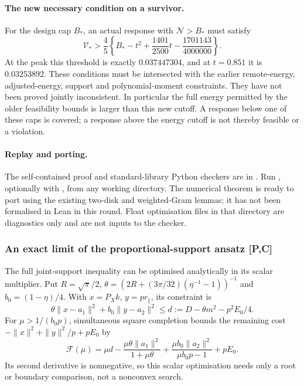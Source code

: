 \paragraph{The new necessary condition on a survivor.}
For the design cap $B_*$, an actual response with $\mathcal N>B_*$ must
satisfy
\begin{equation}\label{eq:weighted-full-energy-survivor}
 \boxed{\quad
 \mathcal V_*>\frac45\left\{B_*-t^2+\frac{1401}{2500}t
                          -\frac{1701143}{4000000}\right\}.
 \quad}
\end{equation}
At the peak this threshold is exactly $0.037447304$, and at $t=0.851$
it is $0.03253892$. These conditions must be intersected with the earlier
remote-energy, adjusted-energy, support and polynomial-moment constraints.
They have not been proved jointly inconsistent. In particular the full
energy permitted by the older feasibility bounds is larger than this
new cutoff. A response below one of these caps is covered; a response
above the energy cutoff is not thereby feasible or a violation.

\paragraph{Replay and porting.}
The self-contained proof and standard-library Python checkers are in
.
Run , optionally with , from
any working directory. The numerical theorem is ready to port using the
existing two-disk and weighted-Gram lemmas; it has not been formalised
in Lean in this round. Float optimisation files in that directory are
diagnostics only and are not inputs to the checker.

\subsubsection{An exact limit of the proportional-support ansatz [P,C]}
\label{sec:proportional-support-obstruction-20261022}
The full joint-support inequality can be optimised analytically in its
scalar multiplier. Put $R=\sqrt\pi/2$,
$\theta=(2R+(3\pi/32)(\eta^{-1}-1))^{-1}$ and $b_0=(1-\eta)/4$.
With $x=P_Xk$, $y=pr_\parallel$, its constraint is
\[
 \theta\|x-a_1\|^2+b_0\|y-a_2\|^2
 \le d:=D-\theta m^2-p^2E_0/4.
\]
For $\mu>1/(b_0p)$, simultaneous square completion bounds the remaining
cost $-\|x\|^2+\|y\|^2/p+pE_0$ by
\[
 \mathcal F(\mu)=\mu d-\frac{\mu\theta\|a_1\|^2}{1+\mu\theta}
 +\frac{\mu b_0\|a_2\|^2}{\mu b_0p-1}+pE_0.
\]
Its second derivative is nonnegative, so this scalar optimisation needs
only a root or boundary comparison, not a nonconvex search.

